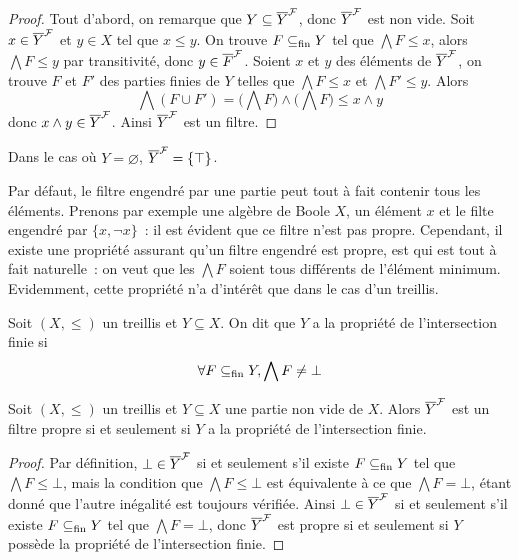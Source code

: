 \begin{proof}
  Tout d'abord, on remarque que $Y\subseteq \overline{Y}^{\mathcal F}$, donc $\overline{Y}^{\mathcal F}$ est
  non vide. Soit $x\in \overline{Y}^{\mathcal F}$ et $y\in X$ tel que $x\leq y$. On trouve
  $F\subseteq_{\mathrm{fin}} Y$ tel que $\bigwedge F\leq x$, alors $\bigwedge F \leq y$ par
  transitivité, donc $y\in \overline{F}^{\mathcal F}$. Soient $x$ et $y$ des éléments de
  $\overline{Y}^{\mathcal F}$, on trouve $F$ et $F'$ des parties finies de $Y$ telles que
  $\bigwedge F \leq x$ et $\bigwedge F' \leq y$. Alors
  \[\bigwedge (F\cup F') = \Bigg(\bigwedge F\Bigg)\land\Bigg(\bigwedge F\Bigg)
  \leq x\land y\]
  donc $x\land y \in \overline{Y}^{\mathcal F}$. Ainsi $\overline{Y}^{\mathcal F}$ est un filtre.
\end{proof}

\begin{remark}
  Dans le cas où $Y = \varnothing$, $\overline{Y}^{\mathcal F} = \{\top\}$.
\end{remark}

Par défaut, le filtre engendré par une partie peut tout à fait contenir tous
les éléments. Prenons par exemple une algèbre de Boole $X$, un élément $x$ et le
filte engendré par $\{x,\lnot x\}$~: il est évident que ce filtre n'est pas
propre. Cependant, il existe une propriété assurant qu'un filtre engendré est
propre, est qui est tout à fait naturelle~: on veut que les $\bigwedge F$ soient
tous différents de l'élément minimum. Evidemment, cette propriété n'a d'intérêt
que dans le cas d'un treillis.

\begin{definition}
  Soit $(X,\leq)$ un treillis et $Y\subseteq X$. On dit que $Y$ a la propriété
  de l'intersection finie si
  \[\forall F\subseteq_{\mathrm{fin}} Y, \bigwedge F\neq \bot\]
\end{definition}

\begin{proposition}
  Soit $(X,\leq)$ un treillis et $Y\subseteq X$ une partie non vide de $X$.
  Alors $\overline{Y}^{\mathcal F}$ est un filtre propre si et seulement si $Y$ a la propriété
  de l'intersection finie.
\end{proposition}

\begin{proof}
  Par définition, $\bot\in \overline{Y}^{\mathcal F}$ si et seulement s'il existe $F\subseteq_{\mathrm{fin}} Y$
  tel que $\bigwedge F \leq \bot$, mais la condition que $\bigwedge F\leq \bot$
  est équivalente à ce que $\bigwedge F = \bot$, étant donné que l'autre
  inégalité est toujours vérifiée. Ainsi $\bot\in\overline{Y}^{\mathcal F}$ si et seulement
  s'il existe $F\subseteq_{\mathrm{fin}} Y$ tel que $\bigwedge F = \bot$, donc $\overline{Y}^{\mathcal F}$ est
  propre si et seulement si $Y$ possède la propriété de l'intersection finie.
\end{proof}


